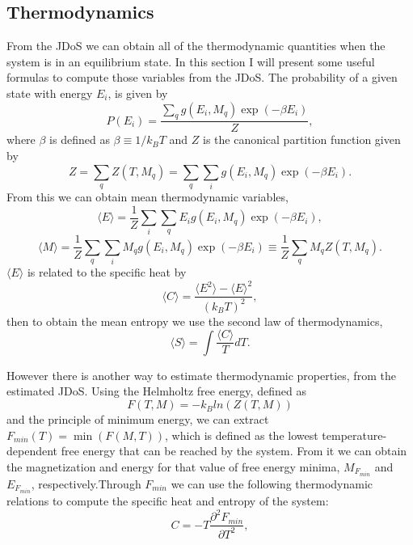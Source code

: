 \subsection{Thermodynamics}

From the JDoS we can obtain all of the thermodynamic quantities when the system is in an equilibrium state. In this section I will present some useful formulas to compute those variables from the JDoS. 
The probability of a given state with energy $E_i$, is given by
\begin{equation}
	P(E_i) = \frac{\sum_q g(E_i, M_q) \exp(-\beta E_i)}{Z},
\end{equation}
where $\beta$ is defined as $\beta \equiv 1/k_BT$ and $Z$ is the canonical partition function given by
\begin{equation}
	Z = \sum_q Z(T, M_q) = \sum_q \sum_i g(E_i, M_q) \exp(-\beta E_i).
\end{equation}
From this we can obtain mean thermodynamic variables, 
\begin{equation}
	\langle E \rangle = \frac{1}{Z} \sum_i \sum_q E_i g(E_i, M_q) \exp(-\beta E_i),
\end{equation}
\begin{equation}
	\langle M \rangle  = \frac{1}{Z} \sum_q \sum_i M_q g(E_i, M_q) \exp(-\beta E_i) \equiv \frac{1}{Z} \sum_q M_q Z(T, M_q).
\end{equation}
$\langle E \rangle$ is related to the specific heat by 
\begin{equation}
	\langle C \rangle = \frac{\langle E^2 \rangle - \langle E \rangle^2}{\left( k_BT \right)^2},
\end{equation}
then to obtain the mean entropy we use the second law of thermodynamics,
\begin{equation}
	\langle S \rangle= \int \frac{\langle C \rangle}{T} dT.
\end{equation}

\pagebreak

However there is another way to estimate thermodynamic properties, from the estimated JDoS.  Using the Helmholtz free energy, defined as 
\begin{equation}
	F(T, M) = - k_B ln(Z(T, M))
\end{equation}
and the principle of minimum energy, we can extract $F_{min} (T) = \min(F(M, T))$, which is defined as the lowest temperature-dependent free energy that can be reached by the system.
From it we can obtain the magnetization and energy for that value of free energy minima, $M_{F_{min}}$ and $E_{F_{min}}$, respectively.Through $F_{min}$ we can use the following thermodynamic relations to compute the specific heat and entropy of the system:
\begin{equation}
	C = - T \frac{\partial^2 F_{min}}{\partial T^2},
\end{equation}

